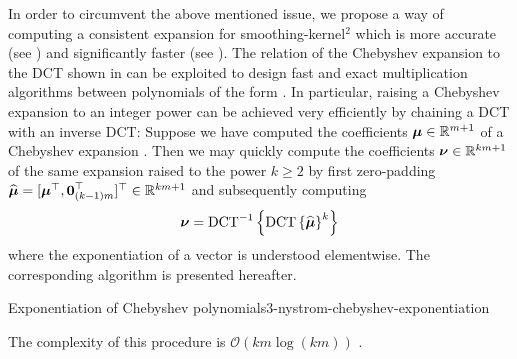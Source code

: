 In order to circumvent the above mentioned issue, we propose a way of computing
a consistent expansion for \gls{smoothing-kernel}$^2$ which is more accurate
(see ) and significantly faster
(see ).
The relation of the Chebyshev expansion to the \gls{DCT} shown in 
can be exploited to design fast and exact multiplication algorithms between polynomials
of the form  \cite[proposition~3.1]{baszenski1997cosine}.
In particular, raising a Chebyshev expansion to an integer power can be achieved
very efficiently by chaining a \gls{DCT} with an inverse \gls{DCT}:
Suppose we have computed the coefficients $\boldsymbol{\mu} \in \mathbb{R}^{m+1}$
of a Chebyshev expansion .
Then we may quickly compute the coefficients $\boldsymbol{\nu} \in \mathbb{R}^{km+1}$
of the same expansion raised to the power $k \geq 2$ by first zero-padding
$\widehat{\boldsymbol{\mu}} = [\boldsymbol{\mu}^{\top}, \boldsymbol{0}_{(k-1)m}^{\top}]^{\top} \in \mathbb{R}^{km+1}$
and subsequently computing
\begin{equation}
    \boldsymbol{\nu} = \operatorname{DCT}^{-1}\left\{ \operatorname{DCT}\left\{\widehat{\boldsymbol{\mu}}\right\}^{k} \right\}
    \label{equ:3-nystrom-chebyshev-potentiate-coefficients}
\end{equation}
where the exponentiation of a vector is understood elementwise.
The corresponding algorithm is presented hereafter.
\begin{algo}{Exponentiation of Chebyshev polynomials}{3-nystrom-chebyshev-exponentiation}
    
\end{algo}
The complexity of this procedure is $\mathcal{O}(km \log(km))$ \cite{makhoul1980fct}.\\
\begin{table}[ht]
    \caption{Runtime comparison of the two approaches with which the coefficients
    of the Chebyshev expansion of a function. We average over 7 runs of the
    algorithms and repeat these runs 100 times to form the mean and standard
    deviation which are given in the below table. We refer to the interpolation
    of \gls{smoothing-kernel}$^{2}$ with \cite[algorithm~1]{lin2017randomized} as \enquote{quadrature},
    to the interpolation of \gls{smoothing-kernel}$^{2}$ with  as \enquote{DCT},
    and finally to the fast squaring algorithm  as \enquote{squaring}.
    For each algorithm, we interpolate \gls{smoothing-kernel} with \gls{smoothing-parameter} $=0.05$,
    at \gls{num-evaluation-points} $=1000$ points, for various values of \gls{chebyshev-degree}.}
    \label{tab:3-nystrom-timing-squared-interpolation}
    
\end{table}

